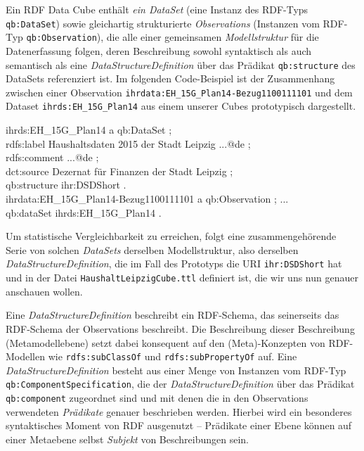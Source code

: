 \documentclass[a4paper,11pt,twoside]{article}
\begin{document}
Ein RDF Data Cube enthält \emph{ein DataSet} (eine Instanz des RDF-Typs
\texttt{qb:DataSet}) sowie gleichartig strukturierte \emph{Observations}
(Instanzen vom RDF-Typ \texttt{qb:Observation}), die alle einer gemeinsamen
\emph{Modellstruktur} für die Datenerfassung folgen, deren Beschreibung sowohl
syntaktisch als auch semantisch als eine \emph{DataStructureDefinition} über
das Prädikat \texttt{qb:structure} des DataSets referenziert ist.  Im folgenden
Code-Beispiel ist der Zusammenhang zwischen einer Observation
\texttt{ihrdata:EH\_15G\_Plan14-Bezug1100111101} und dem Dataset
\texttt{ihrds:EH\_15G\_Plan14} aus einem unserer Cubes prototypisch
dargestellt.
\begin{code}
ihrds:EH\_15G\_Plan14 a qb:DataSet ;\+\\
  rdfs:label {\dq}Haushaltsdaten 2015 der Stadt Leipzig ...{\dq}@de ;\\
  rdfs:comment {\dq}...{\dq}@de ;\\
  dct:source {\dq}Dezernat für Finanzen der Stadt Leipzig{\dq} ;\\
  qb:structure ihr:DSDShort .\-\\[6pt]
ihrdata:EH\_15G\_Plan14-Bezug1100111101 a qb:Observation ; ... \+\\
  qb:dataSet ihrds:EH\_15G\_Plan14 . 
\end{code}

Um statistische Vergleichbarkeit zu erreichen, folgt eine zusammengehörende
Serie von solchen \emph{DataSets} derselben Modellstruktur, also derselben
\emph{DataStructureDefinition}, die im Fall des Prototyps die URI
\texttt{ihr:DSDShort} hat und in der Datei \texttt{HaushaltLeipzigCube.ttl}
definiert ist, die wir uns nun genauer anschauen wollen.

Eine \emph{DataStructureDefinition} beschreibt ein RDF-Schema, das seinerseits
das RDF-Schema der Observations beschreibt. Die Beschreibung dieser
Beschreibung (Metamodellebene) setzt dabei konsequent auf den (Meta)-Konzepten
von RDF-Modellen \cite{RDFS} wie \texttt{rdfs:subClassOf} und
\texttt{rdfs:subPropertyOf} auf.  Eine \emph{DataStructureDefinition} besteht
aus einer Menge von Instanzen vom RDF-Typ \texttt{qb:ComponentSpecification},
die der \emph{DataStructureDefinition} über das Prädikat \texttt{qb:component}
zugeordnet sind und mit denen die in den Observations verwendeten
\emph{Prädikate} genauer beschrieben werden. Hierbei wird ein besonderes
syntaktisches Moment von RDF ausgenutzt -- Prädikate einer Ebene können auf
einer Metaebene selbst \emph{Subjekt} von Beschreibungen sein. 
\end{document}
